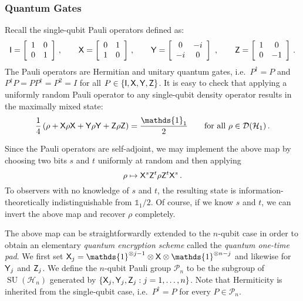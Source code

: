 \subsubsection{Quantum Gates}
Recall  the single-qubit Pauli operators  defined as:
$$
{\sf I} = \left[\begin{array}{cc} 1 & 0\\ 0 & 1\end{array}\right]\,,
\qquad
{\sf X} = \left[\begin{array}{cc} 0 & 1\\ 1 & 0\end{array}\right]\,,
\qquad
{\sf Y} = \left[\begin{array}{cc} 0 & -i\\ -i & 0\end{array}\right]\,\,,
\qquad
{\sf Z} = \left[\begin{array}{cc} 1 & 0\\ 0 & -1\end{array}\right]\,.
$$
The Pauli operators are Hermitian and unitary quantum gates, i.e.\ $P^\dag=P$ and $P^\dag P=P P^\dag = P^2 = I$ for all $P \in \{{\sf I}, {\sf X}, {\sf Y}, {\sf Z}\}$. It is easy to check that applying a uniformly random Pauli operator to any single-qubit density operator results in the maximally mixed state:
$$
\frac{1}{4}\left(\rho +  \xgate\rho  \xgate + \ygate\rho \ygate + \zgate\rho \zgate \right) = \frac{\mathds{1}_1}{2}
\qquad
\text{for all }
\rho \in \mathcal{D} (\mathcal{H}_1)\,.
$$

Since the Pauli operators are self-adjoint, we may implement the above map by choosing two bits $s$ and $t$ uniformly at random and then applying
$$
\rho \mapsto {\sf X}^s {\sf Z}^t \rho {\sf Z}^t {\sf X}^s\,.
$$
To observers with no knowledge of $s$ and $t$, the resulting state is information-theoretically indistinguishable from $\mathds{1}_1/2$. Of course, if we know $s$ and $t$, we can invert the above map and recover $\rho$ completely.


The above map can be straightforwardly extended to the $n$-qubit case in order to obtain an elementary {\em quantum encryption scheme} called the {\em quantum one-time pad}.
We first set $\xgate_j = \mathds{1}^{\otimes j-1} \otimes \xgate \otimes \mathds{1}^{\otimes n-j}$ and likewise for ${\sf Y}_j$ and ${\sf Z}_j$. We define the $n$-qubit Pauli group $\mathcal P_n$ to be the subgroup of $\operatorname{SU}(\mathcal{H}_n)$ generated by $\{{\sf X}_j, {\sf Y}_j, {\sf Z}_j : j = 1, \dots, n \}$. Note that Hermiticity is inherited from the single-qubit case, i.e.\ $P^\dag = P$ for every $P \in \mathcal{P}_n$.



